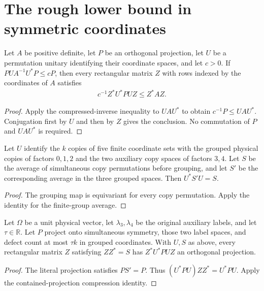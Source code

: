 \section{The rough lower bound in symmetric coordinates}

\begin{theorem}
  \label{thm:reindexed_inverse_compression_lower_bound}
  \leanok
  Let $A$ be positive definite, let $P$ be an orthogonal projection,
  let $U$ be a permutation unitary identifying their coordinate spaces,
  and let $c>0$. If $PUA^{-1}U^*P\leq cP$, then every rectangular
  matrix $Z$ with rows indexed by the coordinates of $A$ satisfies
  \begin{align}
    c^{-1}Z^*U^*PUZ\leq Z^*AZ.
  \end{align}
\end{theorem}
\begin{proof}\leanok
  Apply the compressed-inverse inequality to $UAU^*$ to obtain
  $c^{-1}P\leq UAU^*$. Conjugation first by $U$ and then by $Z$
  gives the conclusion. No commutation of $P$ and $UAU^*$ is required.
\end{proof}

\begin{theorem}
  \label{thm:five_factor_joint_symmetry_coordinates}
  \leanok
  Let $U$ identify the $k$ copies of five finite coordinate sets with
  the grouped physical copies of factors $0,1,2$ and the two auxiliary
  copy spaces of factors $3,4$. Let $S$ be the average of simultaneous
  copy permutations before grouping, and let $S'$ be the corresponding
  average in the three grouped spaces. Then $U^*S'U=S$.
\end{theorem}
\begin{proof}\leanok
  The grouping map is equivariant for every copy permutation.
  Apply the identity for the finite-group average.
\end{proof}

\begin{theorem}
  \label{thm:compressed_actual_low_defect_projection}
  \leanok
  Let $\Omega$ be a unit physical vector, let $\lambda_3,\lambda_4$
  be the original auxiliary labels, and let $\tau\in\mathbb R$.
  Let $P$ project onto simultaneous symmetry, those two label spaces,
  and defect count at most $\tau k$ in grouped coordinates.
  With $U,S$ as above, every rectangular matrix $Z$ satisfying
  $ZZ^*=S$ has $Z^*U^*PUZ$ an orthogonal projection.
\end{theorem}
\begin{proof}\leanok
  The literal projection satisfies $PS'=P$. Thus
  $(U^*PU)ZZ^*=U^*PU$. Apply the contained-projection compression identity.
\end{proof}

